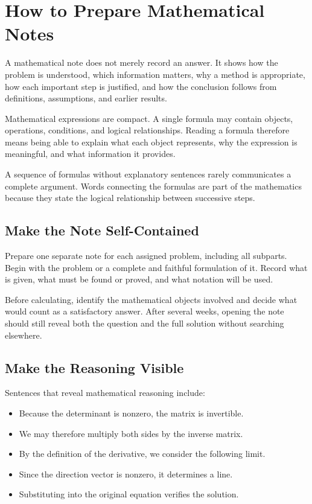 \section*{How to Prepare Mathematical Notes}

A mathematical note does not merely record an answer. It shows how the problem
is understood, which information matters, why a method is appropriate, how each
important step is justified, and how the conclusion follows from definitions,
assumptions, and earlier results.

Mathematical expressions are compact. A single formula may contain objects,
operations, conditions, and logical relationships. Reading a formula therefore
means being able to explain what each object represents, why the expression is
meaningful, and what information it provides.

A sequence of formulas without explanatory sentences rarely communicates a
complete argument. Words connecting the formulas are part of the mathematics
because they state the logical relationship between successive steps.

\subsection*{Make the Note Self-Contained}

Prepare one separate note for each assigned problem, including all subparts.
Begin with the problem or a complete and faithful formulation of it. Record what
is given, what must be found or proved, and what notation will be used.

Before calculating, identify the mathematical objects involved and decide what
would count as a satisfactory answer. After several weeks, opening the note
should still reveal both the question and the full solution without searching
elsewhere.

\subsection*{Make the Reasoning Visible}

Sentences that reveal mathematical reasoning include:
\begin{itemize}
    \item Because the determinant is nonzero, the matrix is invertible.
    \item We may therefore multiply both sides by the inverse matrix.
    \item By the definition of the derivative, we consider the following limit.
    \item Since the direction vector is nonzero, it determines a line.
    \item Substituting into the original equation verifies the solution.
\end{itemize}

